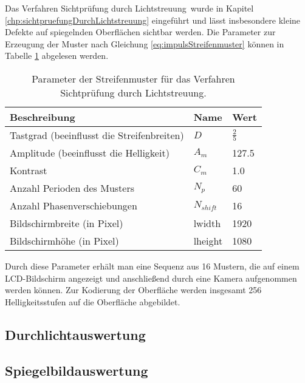 Das Verfahren \glqq Sichtprüfung durch Lichtstreuung\grqq ~wurde in Kapitel \ref{chp:sichtpruefungDurchLichtstreuung} eingeführt und lässt insbesondere kleine Defekte auf spiegelnden Oberflächen sichtbar werden.
Die Parameter zur Erzeugung der Muster nach Gleichung \ref{eq:impulsStreifenmuster} können in Tabelle \ref{tab:paramSichtpruefung} abgelesen werden.

\begin{table}[H]
	\centering
	\caption{Parameter der Streifenmuster für das Verfahren \glqq Sichtprüfung durch Lichtstreuung\grqq.}
	\label{tab:paramSichtpruefung}
	\begin{tabular}{lll}
		\hline 
		\textbf{Beschreibung} & \textbf{Name} & \textbf{Wert} \\ 
		\hline 
		Tastgrad (beeinflusst die Streifenbreiten) & $D$ & $\tfrac{2}{5}$ \\ 
		Amplitude (beeinflusst die Helligkeit) & $A_m$ & 127.5 \\ 
		Kontrast & $C_m$ & 1.0 \\ 
		Anzahl Perioden des Musters & $N_p$ & 60 \\
		Anzahl Phasenverschiebungen & $N_{shift}$ & 16 \\ 
		Bildschirmbreite (in Pixel) & \acrshort{lwidth} & 1920 \\
		Bildschirmhöhe (in Pixel) & \acrshort{lheight} & 1080 \\ 
		\hline 
	\end{tabular}
\end{table}

\noindent
Durch diese Parameter erhält man eine Sequenz aus 16 Mustern, die auf einem LCD-Bildschirm angezeigt und anschließend durch eine Kamera aufgenommen werden können.
Zur Kodierung der Oberfläche werden insgesamt 256 Helligkeitsstufen auf die Oberfläche abgebildet.

{
	\FloatBarrier
    \subsection{Durchlichtauswertung}
    \label{sub:durchlichtAuswertungLichtstreuung}
    
}

{
	\FloatBarrier
    \subsection{Spiegelbildauswertung}
    \label{sub:spiegelbildAuswertungLichtstreuung}
    
}